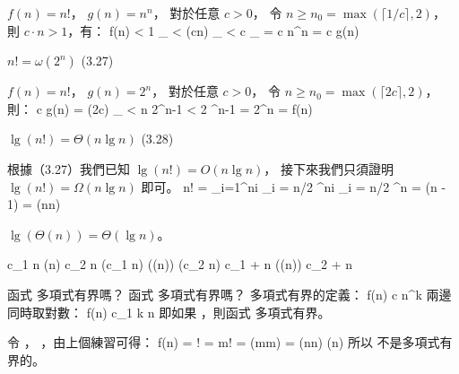 \startANSWER
$f(n)=n!$， $g(n)=n^n$，
對於任意 $c>0$，
令 $n \ge n_0 = \max(\lceil 1/c\rceil, 2)$，
則 $c\cdot n > 1$，有：
\startformula\startmathalignment
{}\le f(n) \NC
< 1 \cdot {}_{} \NR
\NC \NC < (c\cdot n) \cdot {}_{} \NR
\NC \NC < c \cdot {}_{} \NR
\NC \NC = c n^n \NR
\NC \NC = c g(n) \NR
\stopmathalignment\stopformula
\stopANSWER

$n!=\omega(2^n)$ \hfill (3.27)

\startANSWER
$f(n)=n!$， $g(n)=2^n$，
對於任意 $c>0$，
令 $n \ge n_0 = \max(\lceil 2c \rceil, 2)$，
則：
\startformula\startmathalignment
{} \le c g(n) \NC
= (2c) \cdot {}_{} \NR
\NC \NC < n 2^{n-1} \NR
\NC \NC < 2 ^{n-1} \NR
\NC \NC = 2^n \NR
\NC \NC = f(n) \NR
\stopmathalignment\stopformula
\stopANSWER

$\lg(n!)=\Theta(n\lg n)$ \hfill (3.28)

\startANSWER
根據（3.27）我們已知 $\lg(n!)=O(n\lg n)$，
接下來我們只須證明 $\lg(n!)=\Omega(n\lg n)$ 即可。
\startformula\startmathalignment
\NC \lg n! \NC = \sum_{i=1}^{n}\lg i \NR
\NC \NC \ge \sum_{i = \lceil n/2 \rceil}^{n}\lg i \NR
\NC \NC \ge \sum_{i = \lceil n/2 \rceil}^{n} \lg {} \NR
\NC \NC \ge {}\lg {} \NR
\NC \NC = (\lg n - 1) \NR
\NC \NC = \Omega(n\lg n) \NR
\stopmathalignment\stopformula
\stopANSWER
\stopitem

\startitem
$\lg(\Theta(n)) = \Theta(\lg n)$。

\startANSWER
\startformula\startmathalignment[n=3,align={right,middle,left}]
\NC c_1 n \le \NC \Theta(n) \NC \le c_2 n \NR
\NC \lg(c_1 n) \le \NC \lg(\Theta(n)) \NC \le \lg(c_2 n) \NR
\NC \lg c_1 + \lg n \le \NC \lg(\Theta(n)) \NC \le \lg c_2 + \lg n \NR
\stopmathalignment\stopformula
\stopANSWER
\stopitem
\stopigBase
\stopEXERCISE

\startEXERCISE\DIFFICULT
函式  多項式有界嗎？
函式  多項式有界嗎？
\stopEXERCISE
\startANSWER
多項式有界的定義：
\startformula
 f(n) \leq c n^k
\stopformula
兩邊同時取對數：
\startformula
 \lg f(n) \leq c_1 k \lg n
\stopformula
即如果 ，則函式  多項式有界。

令 ， ，由上個練習可得：
\startformula\startalign
 \NC \lg f(n) \NC = \lg \lceil{}\rceil ! \NR
 \NC          \NC = \lg m! \NR
 \NC          \NC = \Theta(m\lg m) \NR
 \NC          \NC = \Theta(\lceil\lg n\rceil \lg \lceil \lg n\rceil) \NR
 \NC          \NC \neq \Theta(\lg n) \NR
\stopalign\stopformula
所以  {\EMP 不是}多項式有界的。

